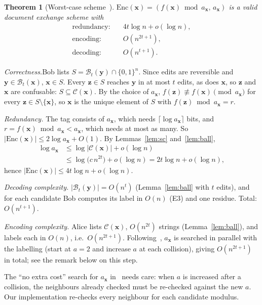 \documentclass[journal,10pt]{IEEEtran}
\newtheorem{theorem}{Theorem}
\newcommand{\step}[1]{\par\smallskip\noindent\emph{#1}\enspace}
\newcommand{\Enc}{\mathrm{Enc}}
\newcommand{\B}{\mathcal{B}}
\newcommand{\C}{\mathcal{C}}
\newcommand{\bx}{\mathbf{x}}
\newcommand{\by}{\mathbf{y}}
\newcommand{\bz}{\mathbf{z}}
\begin{document}
\begin{theorem}[Worst-case scheme~\cite{narayanan}]\label{thm:1}
$\Enc(\bx)=(f(\bx)\bmod a_{\bx},\,a_{\bx})$ is a valid document exchange scheme with
\begin{align*}
\text{redundancy:}\quad & 4t\log n+o(\log n),\\
\text{encoding:}\quad & O(n^{2t+1}),\\
\text{decoding:}\quad & O(n^{t+1}).
\end{align*}
\end{theorem}
\begin{IEEEproof}
\emph{Correctness.}\enspace Bob lists $S=\B_t(\by)\cap\{0,1\}^n$. Since edits are reversible and $\by\in\B_t(\bx)$, $\bx\in S$. Every $\bz\in S$ reaches $\by$ in at most $t$ edits, as does $\bx$, so $\bz$ and $\bx$ are confusable: $S\subseteq\C(\bx)$. By the choice of $a_{\bx}$, $f(\bz)\not\equiv f(\bx)\pmod{a_{\bx}}$ for every $\bz\in S\setminus\{\bx\}$, so $\bx$ is the unique element of $S$ with $f(\bz)\bmod a_{\bx}=r$.

\step{Redundancy.} The tag consists of $a_{\bx}$, which needs $\lceil\log a_{\bx}\rceil$ bits, and $r=f(\bx)\bmod a_{\bx}<a_{\bx}$, which needs at most as many. So $|\Enc(\bx)|\le 2\log a_{\bx}+O(1)$. By Lemmas~\ref{lem:sc} and~\ref{lem:ball},
\begin{align*}
\log a_{\bx}&\le\log|\C(\bx)|+o(\log n)\\
&\le\log\bigl(c\,n^{2t}\bigr)+o(\log n)=2t\log n+o(\log n),
\end{align*}
hence $|\Enc(\bx)|\le 4t\log n+o(\log n)$.

\step{Decoding complexity.} $|\B_t(\by)|=O(n^t)$ (Lemma~\ref{lem:ball} with $t$ edits), and for each candidate Bob computes its label in $O(n)$ (E3) and one residue. Total: $O(n^{t+1})$.

\step{Encoding complexity.} Alice lists $\C(\bx)$, $O(n^{2t})$ strings (Lemma~\ref{lem:ball}), and labels each in $O(n)$, i.e.\ $O(n^{2t+1})$. Following~\cite{narayanan}, $a_{\bx}$ is searched in parallel with the labelling (start at $a=2$ and increase $a$ at each collision), giving $O(n^{2t+1})$ in total; see the remark below on this step.
\end{IEEEproof}

The ``no extra cost'' search for $a_{\bx}$ in~\cite{narayanan} needs care: when $a$ is increased after a collision, the neighbours already checked must be re-checked against the new $a$. Our implementation re-checks every neighbour for each candidate modulus.
\end{document}
